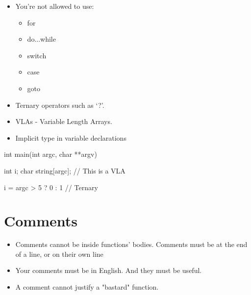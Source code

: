 \documentclass{42-ru}
\begin{document}
        \begin{itemize}

            \item You're not allowed to use:

                \begin{itemize}

                    \item for
                    \item do...while
                    \item switch
                    \item case
                    \item goto

                \end{itemize}

            \item Ternary operators such as `?'.

            \item VLAs - Variable Length Arrays.

            \item Implicit type in variable declarations

        \end{itemize}
        \begin{42ccode}
    int main(int argc, char **argv)
    {
        int     i;
        char    string[argc]; // This is a VLA

        i = argc > 5 ? 0 : 1 // Ternary
    }
        \end{42ccode}
        \newpage

    \section{Comments}

        \begin{itemize}

            \item Comments cannot be inside functions' bodies.
                Comments must be at the end of a line, or on their own line

            \item Your comments must be in English. And they must be
                useful.

            \item A comment cannot justify a "bastard" function.

        \end{itemize}
        \newpage
\end{document}
